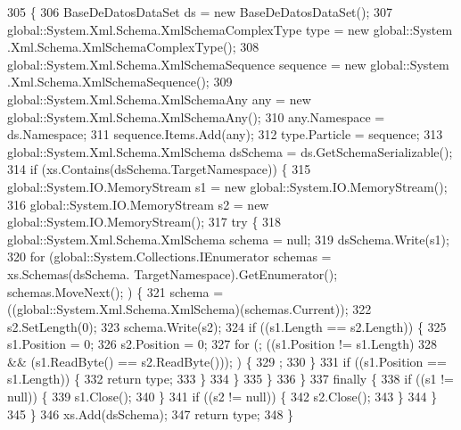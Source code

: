 \begin{DoxyCode}
305                                                                                                            
                             \{
306             BaseDeDatosDataSet ds = \textcolor{keyword}{new} BaseDeDatosDataSet();
307             global::System.Xml.Schema.XmlSchemaComplexType type = \textcolor{keyword}{new} global::System
      .Xml.Schema.XmlSchemaComplexType();
308             global::System.Xml.Schema.XmlSchemaSequence sequence = \textcolor{keyword}{new} global::System
      .Xml.Schema.XmlSchemaSequence();
309             global::System.Xml.Schema.XmlSchemaAny any = \textcolor{keyword}{new} global::System.Xml.Schema.XmlSchemaAny();
310             any.Namespace = ds.Namespace;
311             sequence.Items.Add(any);
312             type.Particle = sequence;
313             global::System.Xml.Schema.XmlSchema dsSchema = ds.GetSchemaSerializable();
314             \textcolor{keywordflow}{if} (xs.Contains(dsSchema.TargetNamespace)) \{
315                 global::System.IO.MemoryStream s1 = \textcolor{keyword}{new} global::System.IO.MemoryStream();
316                 global::System.IO.MemoryStream s2 = \textcolor{keyword}{new} global::System.IO.MemoryStream();
317                 \textcolor{keywordflow}{try} \{
318                     global::System.Xml.Schema.XmlSchema schema = null;
319                     dsSchema.Write(s1);
320                     \textcolor{keywordflow}{for} (global::System.Collections.IEnumerator schemas = xs.Schemas(dsSchema.
      TargetNamespace).GetEnumerator(); schemas.MoveNext(); ) \{
321                         schema = ((global::System.Xml.Schema.XmlSchema)(schemas.Current));
322                         s2.SetLength(0);
323                         schema.Write(s2);
324                         \textcolor{keywordflow}{if} ((s1.Length == s2.Length)) \{
325                             s1.Position = 0;
326                             s2.Position = 0;
327                             \textcolor{keywordflow}{for} (; ((s1.Position != s1.Length) 
328                                         && (s1.ReadByte() == s2.ReadByte())); ) \{
329                                 ;
330                             \}
331                             \textcolor{keywordflow}{if} ((s1.Position == s1.Length)) \{
332                                 \textcolor{keywordflow}{return} type;
333                             \}
334                         \}
335                     \}
336                 \}
337                 \textcolor{keywordflow}{finally} \{
338                     \textcolor{keywordflow}{if} ((s1 != null)) \{
339                         s1.Close();
340                     \}
341                     \textcolor{keywordflow}{if} ((s2 != null)) \{
342                         s2.Close();
343                     \}
344                 \}
345             \}
346             xs.Add(dsSchema);
347             \textcolor{keywordflow}{return} type;
348         \}
\end{DoxyCode}

